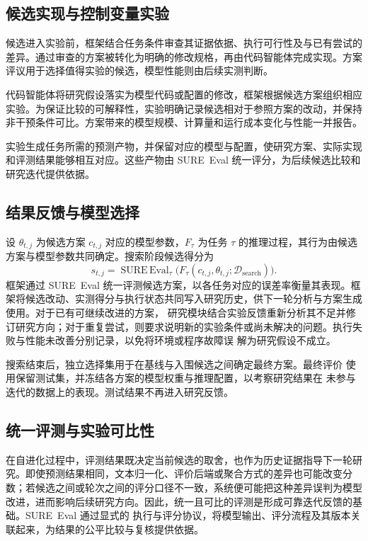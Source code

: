 \documentclass{article}
\begin{document}
\subsection{候选实现与控制变量实验}

候选进入实验前，框架结合任务条件审查其证据依据、执行可行性及与已有尝试的差异。通过审查的方案被转化为明确的修改规格，再由代码智能体完成实现。方案评议用于选择值得实验的候选，模型性能则由后续实测判断。

代码智能体将研究假设落实为模型代码或配置的修改，框架根据候选方案组织相应实验。为保证比较的可解释性，实验明确记录候选相对于参照方案的改动，并保持非干预条件可比。方案带来的模型规模、计算量和运行成本变化与性能一并报告。

实验生成任务所需的预测产物，并保留对应的模型与配置，使研究方案、实际实现和评测结果能够相互对应。这些产物由 SURE~Eval 统一评分，为后续候选比较和研究迭代提供依据。

\subsection{结果反馈与模型选择}

设 $\theta_{t,j}$ 为候选方案 $c_{t,j}$ 对应的模型参数，$F_{\tau}$ 为任务 $\tau$ 的推理过程，其行为由候选方案与模型参数共同确定。搜索阶段候选得分为
\begin{equation}
s_{t,j}=\operatorname{SURE\,Eval}_{\tau}
 \bigl(F_{\tau}(c_{t,j},\theta_{t,j};\mathcal{D}_{\mathrm{search}})\bigr).
\end{equation}
框架通过 SURE~Eval 统一评测候选方案，以各任务对应的误差率衡量其表现。框架将候选改动、实测得分与执行状态共同写入研究历史，供下一轮分析与方案生成使用。对于已有可继续改进的方案，
研究模块结合实验反馈重新分析其不足并修订研究方向；对于重复尝试，则要求说明新的实验条件或尚未解决的问题。执行失败与性能未改善分别记录，以免将环境或程序故障误
解为研究假设不成立。

搜索结束后，独立选择集用于在基线与入围候选之间确定最终方案。最终评价
使用保留测试集，并冻结各方案的模型权重与推理配置，以考察研究结果在
未参与迭代的数据上的表现。测试结果不再进入研究反馈。

\subsection{统一评测与实验可比性}
\label{sec:evaluation}

在自进化过程中，评测结果既决定当前候选的取舍，也作为历史证据指导下一轮研究。即使预测结果相同，文本归一化、评价后端或聚合方式的差异也可能改变分数；若候选之间或轮次之间的评分口径不一致，系统便可能把这种差异误判为模型改进，进而影响后续研究方向。因此，统一且可比的评测是形成可靠迭代反馈的基础。SURE~Eval 通过显式的
执行与评分协议，将模型输出、评分流程及其版本关联起来，为结果的公平比较与复核提供依据\citep{sureeval_manuscript}。
\end{document}
